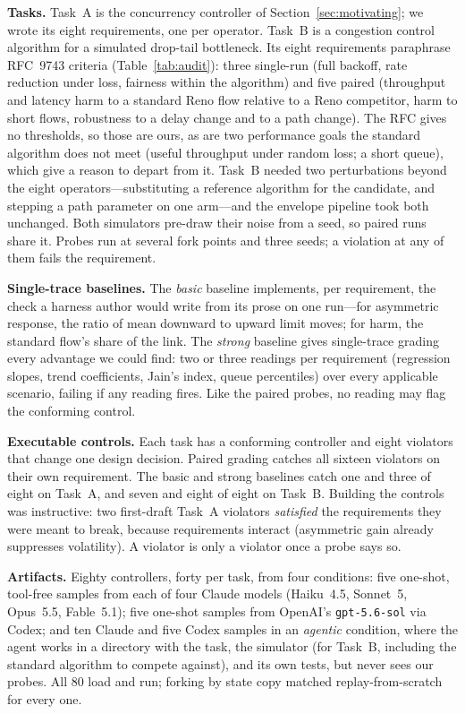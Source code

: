 \documentclass[conference]{IEEEtran}
\begin{document}
	\textbf{Tasks.} Task~A is the concurrency controller of
	Section~\ref{sec:motivating}; we wrote its eight requirements, one per
	operator. Task~B is a congestion control algorithm for a simulated
	drop-tail bottleneck. Its eight requirements paraphrase RFC~9743
	criteria (Table~\ref{tab:audit}): three single-run (full backoff, rate
	reduction under loss, fairness within the algorithm) and five paired
	(throughput and latency harm to a standard Reno flow relative to a
	Reno competitor, harm to short flows, robustness to a delay change and
	to a path change). The RFC gives no thresholds, so those are ours, as
	are two performance goals the standard algorithm does not meet (useful
	throughput under random loss; a short queue), which give a reason to
	depart from it. Task~B needed two perturbations beyond the eight
	operators---substituting a reference algorithm for the candidate, and
	stepping a path parameter on one arm---and the envelope pipeline took
	both unchanged. Both simulators pre-draw their noise from a seed, so
	paired runs share it. Probes run at several fork points and three
	seeds; a violation at any of them fails the requirement.
	
	\textbf{Single-trace baselines.} The \emph{basic} baseline implements,
	per requirement, the check a harness author would write from its prose
	on one run---for asymmetric response, the ratio of mean downward to
	upward limit moves; for harm, the standard flow's share of the link.
	The \emph{strong} baseline gives single-trace grading every advantage
	we could find: two or three readings per requirement (regression
	slopes, trend coefficients, Jain's index, queue percentiles) over every
	applicable scenario, failing if any reading fires. Like the paired
	probes, no reading may flag the conforming control.
	
	\textbf{Executable controls.} Each task has a conforming controller and
	eight violators that change one design decision. Paired grading catches
	all sixteen violators on their own requirement. The basic and strong
	baselines catch one and three of eight on Task~A, and seven and eight of
	eight on Task~B. Building the controls was instructive: two first-draft
	Task~A violators \emph{satisfied} the requirements they were meant to
	break, because requirements interact (asymmetric gain already
	suppresses volatility). A violator is only a violator once a probe says
	so.
	
	\textbf{Artifacts.} Eighty controllers, forty per task, from four
	conditions: five one-shot, tool-free samples from each of four Claude
	models (Haiku~4.5, Sonnet~5, Opus~5.5, Fable~5.1); five one-shot samples
	from OpenAI's \texttt{gpt-5.6-sol} via Codex; and ten Claude and five
	Codex samples in an \emph{agentic} condition, where the agent works in a
	directory with the task, the simulator (for Task~B, including the
	standard algorithm to compete against), and its own tests, but never
	sees our probes. All 80 load and run; forking by state copy matched
	replay-from-scratch for every one.
	
\end{document}
